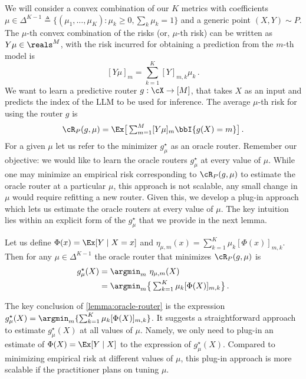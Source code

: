 We will consider a convex combination of our $K$ metrics with coefficients $\mu \in \Delta^{K-1} \triangleq \{(\mu_1, \dots, \mu_K): \mu_k \ge 0, \sum_k \mu_k = 1\}$ and a generic point $(X, Y)\sim P$. The $\mu$-th convex combination of the risks (or, $\mu$-th risk) can be written as $Y\mu\in \reals^{M}$, with the risk incurred for obtaining a prediction from the $m$-th model is 
\[
\textstyle [Y\mu]_m = \sum_{k = 1}^K [Y]_{m, k} \mu_k\,.
\] We want to learn a predictive router $g: \cX \to [M]$, that takes $X$ as an input and predicts the index of the LLM to be used for inference. The average $\mu$-th risk for using the router $g$ is 
\begin{equation}\label{eq:RM}
  \textstyle   \cR_P(g, \mu) = \Ex\big [\sum_{m = 1}^M[Y\mu]_m \bbI\{g(X) = m\} \big]\,. 
\end{equation} For a given $\mu$ let us refer to the minimizer $g_\mu^\star$ as an oracle router. Remember our objective: we would like to learn the oracle routers $g_\mu^\star$ at every value of $\mu$. While one may minimize an empirical risk corresponding to $\cR_P(g, \mu)$ to estimate the oracle router at a particular $\mu$, this approach is not scalable, any small change in $\mu$ would require refitting a new router. Given this, we develop a plug-in approach which lets us estimate the oracle routers at every value of $\mu$. The key intuition lies within an explicit form of the $g_\mu^\star$ that we provide in the next lemma. 
\begin{lemma} \label{lemma:oracle-router}
    Let us define $\Phi(x) = \Ex [Y\mid X = x]$ and $\eta_{\mu, m}(x) = \sum_{k = 1}^K \mu_k [\Phi (x)]_{m, k} $. Then for any $\mu\in \Delta^{K-1}$ the oracle router that minimizes $\cR_P(g, \mu)$ is 
    \begin{align} \label{eq:oracle-router-2}
        \textstyle g_\mu^\star(X) & \textstyle = \argmin_m ~ \eta_{\mu, m} (X)\\ 
       & \textstyle  = \argmin_m \big\{ \sum_{k = 1}^K \mu_k [\Phi (X)]_{m, k} \big\} \, \nonumber.
    \end{align}
\end{lemma}
The key conclusion of \ref{lemma:oracle-router} is the expression $ g_\mu^\star(X)= \argmin_m \{ \sum_{k = 1}^K \mu_k [\Phi (X)]_{m, k} \} $. %
It suggests a straightforward approach to estimate $g_\mu^\star(X)$ at all values of $\mu$.  Namely, we only need to plug-in an estimate of $\Phi(X) = \Ex[Y \mid X]$ to the expression of $g_\mu^\star(X)$. Compared to minimizing empirical risk at different values of $\mu$, this plug-in approach is more scalable if the practitioner plans on tuning $\mu$. %
